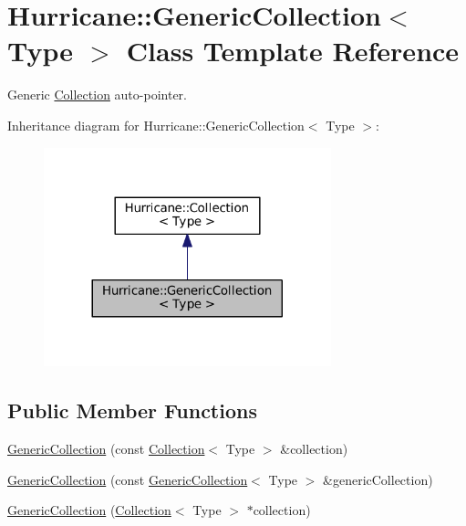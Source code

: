 \hypertarget{classHurricane_1_1GenericCollection}{}\section{Hurricane\+:\+:Generic\+Collection$<$ Type $>$ Class Template Reference}
\label{classHurricane_1_1GenericCollection}


Generic \mbox{\hyperlink{classHurricane_1_1Collection}{Collection}} auto-\/pointer.  




Inheritance diagram for Hurricane\+:\+:Generic\+Collection$<$ Type $>$\+:\nopagebreak
\begin{figure}[H]
\begin{center}
\leavevmode
\includegraphics[width=236pt]{classHurricane_1_1GenericCollection__inherit__graph}
\end{center}
\end{figure}
\subsection*{Public Member Functions}
\begin{DoxyCompactItemize}
\item 
\mbox{\hyperlink{classHurricane_1_1GenericCollection_a177ca321f1b7761c8b000a59051ba9f9}{Generic\+Collection}} (const \mbox{\hyperlink{classHurricane_1_1Collection}{Collection}}$<$ Type $>$ \&collection)
\item 
\mbox{\hyperlink{classHurricane_1_1GenericCollection_a9b77dc014864c2248f31b9dfee242d25}{Generic\+Collection}} (const \mbox{\hyperlink{classHurricane_1_1GenericCollection}{Generic\+Collection}}$<$ Type $>$ \&generic\+Collection)
\item 
\mbox{\hyperlink{classHurricane_1_1GenericCollection_a8e4f70213efb85c0ba802b7de9c03b32}{Generic\+Collection}} (\mbox{\hyperlink{classHurricane_1_1Collection}{Collection}}$<$ Type $>$ $\ast$collection)
\end{DoxyCompactItemize}


